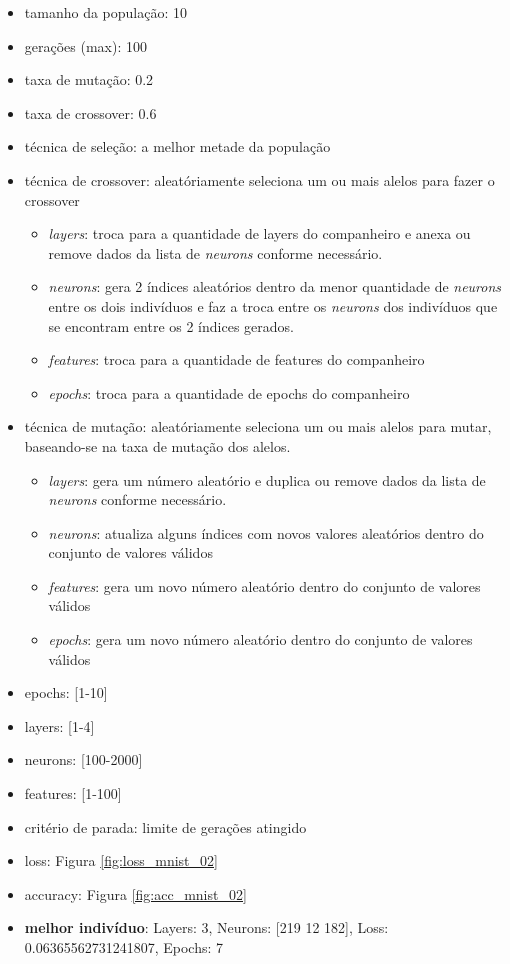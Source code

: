 \documentclass[twoside,conference,a4paper]{IEEEtran}
\begin{document}
\begin{itemize}
    \item tamanho da população: 10
    \item gerações (max): 100
    \item taxa de mutação: 0.2
    \item taxa de crossover: 0.6
    \item técnica de seleção: a melhor metade da população
    \item técnica de crossover: aleatóriamente seleciona um ou mais alelos para fazer o crossover
    \begin{itemize}
        \item \emph{layers}: troca para a quantidade de layers do companheiro e anexa ou remove dados da lista de \emph{neurons} conforme necessário.
        \item \emph{neurons}: gera 2 índices aleatórios dentro da menor quantidade de \emph{neurons} entre os dois indivíduos e faz a troca entre os \emph{neurons} dos indivíduos que se encontram entre os 2 índices gerados.
        \item \emph{features}: troca para a quantidade de features do companheiro
        \item \emph{epochs}: troca para a quantidade de epochs do companheiro
    \end{itemize}
    \item técnica de mutação: aleatóriamente seleciona um ou mais alelos para mutar, baseando-se na taxa de mutação dos alelos.
    \begin{itemize}
        \item \emph{layers}: gera um número aleatório e duplica ou remove dados da lista de \emph{neurons} conforme necessário.
        \item \emph{neurons}: atualiza alguns índices com novos valores aleatórios dentro do conjunto de valores válidos
        \item \emph{features}: gera um novo número aleatório dentro do conjunto de valores válidos
        \item \emph{epochs}: gera um novo número aleatório dentro do conjunto de valores válidos
    \end{itemize}
    \item epochs: [1-10]
    \item layers: [1-4]
    \item neurons: [100-2000]
    \item features: [1-100]
    \item critério de parada: limite de gerações atingido
    \item loss: Figura \ref{fig:loss_mnist_02}
    \item accuracy: Figura \ref{fig:acc_mnist_02}
    \item \textbf{melhor indivíduo}: Layers: 3, Neurons: [219  12 182], Loss: 0.06365562731241807, Epochs: 7
\end{itemize}
\end{document}
